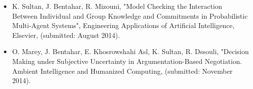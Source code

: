 \begin{itemize}
\item K. Sultan, J. Bentahar, R. Mizouni, "Model Checking the Interaction Between Individual and Group Knowledge and Commitments in Probabilistic Multi-Agent Systems", Engineering Applications of Artificial Intelligence, Elsevier, (submitted: August 2014).
\item O. Marey, J. Bentahar, E. Khosrowshahi Asl, K. Sultan, R. Dssouli, "Decision Making under Subjective Uncertainty in Argumentation-Based Negotiation.  Ambient Intelligence and Humanized Computing, (submitted: November 2014).
\end{itemize}




